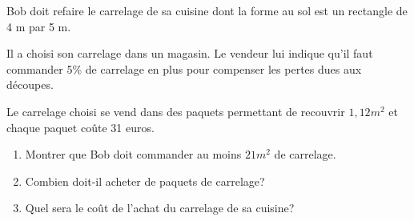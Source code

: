 
Bob doit refaire le carrelage de sa cuisine dont la forme au sol est un rectangle de 4 m par 5 m. 

Il a choisi son carrelage dans un magasin. Le vendeur lui indique qu'il faut commander 5\% de carrelage en plus pour compenser les pertes dues aux découpes. 

Le carrelage choisi se vend dans des paquets permettant de recouvrir $1,12 m^2$ et chaque paquet coûte 31 euros. 

\begin{enumerate}
\item Montrer que Bob doit commander au moins $21 m^2$ de carrelage.
\item Combien doit-il acheter de paquets de carrelage? 
\item Quel sera le coût de l'achat du carrelage de sa cuisine? 
\end{enumerate}
